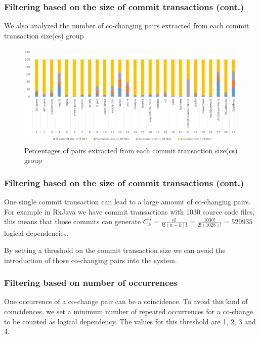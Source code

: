 \documentclass{beamer}
\newcommand*{\Comb}[2]{{}C^{#1}_{#2}}%
\begin{document}
 \begin{frame}
\frametitle{Filtering based on the size of commit transactions (cont.)}

We also analyzed the number of co-changing pairs extracted from each commit transaction size(cs) group

\begin{center}
     \begin{figure}
	\includegraphics[width=\textwidth]{ld_distribution.png}
	\caption{\label{fig:fig1} Percentages of pairs extracted from each commit transaction size(cs) group}
     \end{figure}
\end{center}
\end{frame}

 \begin{frame}
\frametitle{Filtering based on the size of commit transactions (cont.)}

One single commit transaction can lead to a large amount of co-changing pairs. 
 \vskip 0.3cm 
For example in RxJava we have commit transactions with 1030 source code files, this means that those commits can generate 
$\Comb{n}{k}=\frac{n!}{k!(n-k)!} = \frac{1030!}{2!(1028)!} = 529 935$ logical dependencies.
 \vskip 0.3cm 

 By setting a threshold on the commit transaction size we can avoid the introduction of those co-changing pairs into the system.

\end{frame}

 \begin{frame}
\frametitle{Filtering based on number of occurrences}
One occurrence of a co-change pair can be a coincidence. To avoid this kind of coincidences, we set a minimum number of
repeated occurrences for a co-change to be counted as logical dependency. The values for this threshold are 1,
2, 3 and 4.

\end{frame}
\end{document}
